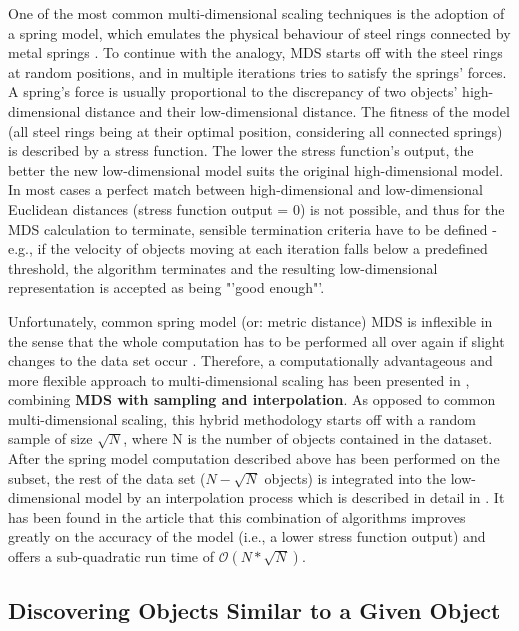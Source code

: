 One of the most common multi-dimensional scaling techniques is the adoption of a spring model, which emulates the physical behaviour of steel rings connected by metal springs \cite{Morrison:2003:FMS}. To continue with the analogy, MDS starts off with the steel rings at random positions, and in multiple iterations tries to satisfy the springs' forces. A spring's force is usually proportional to the discrepancy of two objects' high-dimensional distance and their low-dimensional distance. The fitness of the model (all steel rings being at their optimal position, considering all connected springs) is described by a stress function. The lower the stress function's output, the better the new low-dimensional model suits the original high-dimensional model. In most cases a perfect match between high-dimensional and low-dimensional Euclidean distances (stress function output = 0) is not possible, and thus for the MDS calculation to terminate, sensible termination criteria have to be defined - e.g., if the velocity of objects moving at each iteration falls below a predefined threshold, the algorithm terminates and the resulting low-dimensional representation is accepted as being "'good enough"'.

Unfortunately, common spring model (or: metric distance) MDS is inflexible in the sense that the whole computation has to be performed all over again if slight changes to the data set occur \cite{Morrison:2003:FMS}. 
Therefore, a computationally advantageous and more flexible approach to multi-dimensional scaling has been presented in \cite{Morrison:2003:FMS}, combining \textbf{MDS with sampling and interpolation}. As opposed to common multi-dimensional
scaling, this hybrid methodology starts off with a random sample of size $\sqrt{N}$, where N is the number of objects contained in the dataset. After the spring model computation described above has been performed on the subset, the rest of the data set ($N - \sqrt{N}$ objects) is integrated into the low-dimensional model by an interpolation process which is described in detail in \cite{Morrison:2003:FMS}. It has been found in the article that this combination of algorithms improves greatly on the accuracy of the model (i.e., a lower stress function output) and offers a sub-quadratic run time of $\mathcal O(N*\sqrt{N})$.

\subsection{Discovering Objects Similar to a Given Object}

